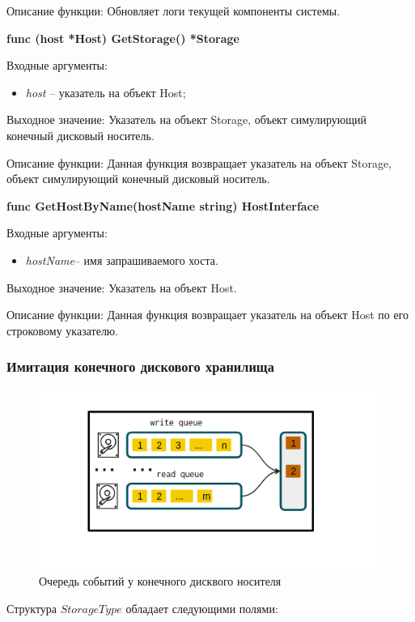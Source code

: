 Описание функции: Обновляет логи текущей компоненты системы. 


\textbf{func (host *Host) GetStorage() *Storage }

Входные аргументы:
\begin{itemize}
	\item \textit{host} -- указатель на объект Host;
\end{itemize}
Выходное значение: Указатель на объект Storage, объект симулирующий конечный дисковый носитель.

Описание функции: Данная функция возвращает указатель на объект Storage, объект симулирующий конечный дисковый носитель.


\textbf{func GetHostByName(hostName string) HostInterface }

Входные аргументы: 
\begin{itemize}
	\item \textit{hostName}-- имя запрашиваемого хоста. 
\end{itemize}
Выходное значение: Указатель на объект Host.

Описание функции: Данная функция возвращает указатель на объект Host по его строковому указателю.

\subsubsection{Имитация конечного дискового хранилища}
\begin{figure}[t!]
	\centering
	\includegraphics[width=\textwidth]{Kenenbek/hdd_queue.png}
	\caption{Очередь событий у конечного дисквого носителя}
	\label{fig:hdd_queue}
\end{figure}

Структура $StorageType$ обладает следующими полями:

